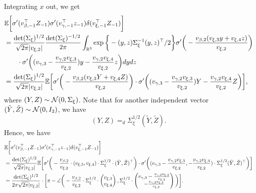 Integrating $x$ out, we get
\begin{align*}
	& {\mathbb{E}} \bigg[\sigma'(v_{\beta, -1}^\top Z_{-1})  \sigma'(v_{\gamma, -1}^\top z_{-1}) \delta(v_{\xi, -1}^\top Z_{-1})\bigg] \\
	& = \frac{\det(\Sigma_\xi)^{1/2}}{\sqrt{2\pi} |v_{\xi, 2}|} \frac{\det(\Sigma_\xi)^{-1/2}}{2\pi} \int_{{\mathbb{R}}^3} \exp\bigg\{-(y, z) \Sigma_\xi^{-1} (y, z)^\top/2\bigg\} \sigma'\bigg(-\frac{v_{\beta, 2} (v_{\xi, 3} y + v_{\xi, 4} z)}{v_{\xi, 2}}\bigg) \\
	& \qquad \cdot \sigma'\bigg((v_{\gamma, 3} - \frac{v_{\gamma, 2} v_{\xi, 3}}{v_{\xi, 2}} ) y - \frac{v_{\gamma, 2} v_{\xi, 4}}{v_{\xi, 2}}z\bigg) dydz \\
	& = \frac{\det(\Sigma_\xi)^{1/2}}{\sqrt{2\pi} |v_{\xi, 2}|} {\mathbb{E}} \bigg[\sigma'\bigg(-\frac{v_{\beta, 2} (v_{\xi, 3} Y + v_{\xi, 4} Z)}{v_{\xi, 2}}\bigg) \cdot \sigma'\bigg((v_{\gamma, 3} - \frac{v_{\gamma, 2} v_{\xi, 3}}{v_{\xi, 2}} ) Y - \frac{v_{\gamma, 2} v_{\xi, 4}}{v_{\xi, 2}}Z\bigg)\bigg],
\end{align*}
where $(Y, Z)\sim {\mathcal{N}}(0, \Sigma_\xi)$. Note that for another independent vector $(\tilde Y, \tilde Z)\sim {\mathcal{N}}(0, I_2)$, we have
\[
	(Y, Z) =_d \Sigma_\xi^{1/2} (\tilde Y, \tilde Z).
\]
Hence, we have
\begin{align*}
	& {\mathbb{E}} \bigg[\sigma'(v_{\beta, -1}^\top Z_{-1})  \sigma'(v_{\gamma, -1}^\top z_{-1}) \delta(v_{\xi, -1}^\top Z_{-1})\bigg] \\
	& = \frac{\det(\Sigma_\xi)^{1/2}}{\sqrt{2\pi} |v_{\xi, 2}|} {\mathbb{E}} \bigg[\sigma'\bigg(-\frac{v_{\beta, 2}}{v_{\xi, 2}} \cdot (v_{\xi, 3}, v_{\xi, 4}) \cdot \Sigma_\xi^{1/2}\cdot (\tilde Y, \tilde Z)^\top \bigg) \cdot \sigma'\bigg((v_{\gamma, 3} - \frac{v_{\gamma, 2} v_{\xi, 3}}{v_{\xi, 2}} ,   - \frac{v_{\gamma, 2} v_{\xi, 4}}{v_{\xi, 2}} ) \cdot \Sigma_\xi^{1/2} (\tilde Y, \tilde Z)^\top\bigg)\bigg] \\
	& = \frac{\det(\Sigma_\xi)^{1/2}}{2\pi\sqrt{2\pi} |v_{\xi, 2}|} \cdot \bigg[\pi - \angle\bigg( -\frac{v_{\beta, 2}}{v_{\xi, 2}} \cdot  \Sigma_\xi^{1/2} \cdot 
	\begin{pmatrix}
		v_{\xi, 3} \\
		v_{\xi, 4}
	\end{pmatrix}, 
	\Sigma_{\xi}^{1/2}\cdot
	\begin{pmatrix}
		v_{\gamma, 3} - \frac{v_{\gamma, 2} v_{\xi, 3}}{v_{\xi, 2}}\\
		- \frac{v_{\gamma, 2} v_{\xi, 4}}{v_{\xi, 2}}
	\end{pmatrix}
	\bigg)
	\bigg].
\end{align*}

